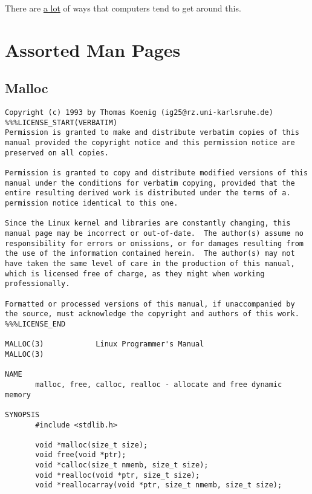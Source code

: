 There are \href{https://en.wikipedia.org/wiki/Stack_buffer_overflow}{a lot} of ways that computers tend to get around this.

\section{Assorted Man Pages}

\subsection{Malloc}\label{man_malloc}

{
\begin{center}
\fontsize{10pt}{10pt}\selectfont

\begin{verbatim}
Copyright (c) 1993 by Thomas Koenig (ig25@rz.uni-karlsruhe.de)
%%%LICENSE_START(VERBATIM)
Permission is granted to make and distribute verbatim copies of this
manual provided the copyright notice and this permission notice are
preserved on all copies.

Permission is granted to copy and distribute modified versions of this
manual under the conditions for verbatim copying, provided that the
entire resulting derived work is distributed under the terms of a.
permission notice identical to this one.

Since the Linux kernel and libraries are constantly changing, this
manual page may be incorrect or out-of-date.  The author(s) assume no
responsibility for errors or omissions, or for damages resulting from
the use of the information contained herein.  The author(s) may not
have taken the same level of care in the production of this manual,
which is licensed free of charge, as they might when working
professionally.

Formatted or processed versions of this manual, if unaccompanied by
the source, must acknowledge the copyright and authors of this work.
%%%LICENSE_END

MALLOC(3)            Linux Programmer's Manual                MALLOC(3) 

NAME
       malloc, free, calloc, realloc - allocate and free dynamic memory

SYNOPSIS
       #include <stdlib.h>

       void *malloc(size_t size);
       void free(void *ptr);
       void *calloc(size_t nmemb, size_t size);
       void *realloc(void *ptr, size_t size);
       void *reallocarray(void *ptr, size_t nmemb, size_t size);


\end{verbatim}
\end{center}}
